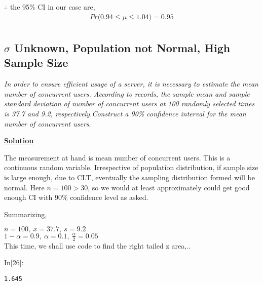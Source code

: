 \documentclass[float=false,crop=false]{standalone}
\begin{document}
    \(\therefore\) the 95\% CI in our case are, \[
\begin{aligned}
Pr\Big( 0.94 \leq \mu \leq 1.04\Big) = 0.95 \nonumber \\
\end{aligned}
\]

    \subsection{\texorpdfstring{\(\sigma\) Unknown, Population not Normal,
High Sample
Size}{\textbackslash{}sigma Unknown, Population not Normal, High Sample Size}}\label{sigma-unknown-population-not-normal-high-sample-size}

    \emph{In order to ensure efficient usage of a server, it is necessary to
estimate the mean number of concurrent users. According to records, the
sample mean and sample standard deviation of number of concurrent users
at 100 randomly selected times is 37.7 and 9.2, respectively.Construct a
90\% confidence interval for the mean number of concurrent users}.

    \textbf{\href{https://www.utdallas.edu/~mbaron/3341/Practice12.pdf}{Solution}}

The measurement at hand is mean number of concurrent users. This is a
continuous random variable. Irrespective of population distribution, if
sample size is large enough, due to CLT, eventually the sampling
distribution formed will be normal. Here \(n=100 > 30\), so we would at
least approximately could get good enough CI with 90\% confidence level
as asked.

Summarizing,

\(n=100, \ x = 37.7, \ s = 9.2\)\\
\(1 - \alpha = 0.9, \ \alpha=0.1, \ \frac{\alpha}{2} = 0.05\)\\
This time, we shall use code to find the right tailed z area,..
\begin{InVerbatim}[commandchars=\\\{\},fontsize=\scriptsize]
{\color{incolor}In[{\color{incolor}26}]:}  
                
                 
                
         
\end{InVerbatim}
    \begin{Verbatim}[commandchars=\\\{\},fontsize=\footnotesize]
1.645

    \end{Verbatim}
\end{document}
